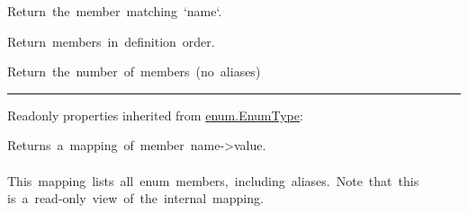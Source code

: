 \begin{longtable}[]
\begin{minipage}[t]{\linewidth}
\begin{longtable}[]
\begin{minipage}[t]{\linewidth}
\begin{description}
\tightlist
\item[\protect\hypertarget{illuminationType-__getitem__}{}{\textbf{\_\_getitem\_\_}}(name){{
from \href{enum.html\#EnumType}{enum.EnumType}}}]
{Return~the~member~matching~`name`.}
\end{description}

\begin{description}
\tightlist
\item[\protect\hypertarget{illuminationType-__iter__}{}{\textbf{\_\_iter\_\_}}(){{
from \href{enum.html\#EnumType}{enum.EnumType}}}]
{Return~members~in~definition~order.}
\end{description}

\begin{description}
\tightlist
\item[\protect\hypertarget{illuminationType-__len__}{}{\textbf{\_\_len\_\_}}(){{
from \href{enum.html\#EnumType}{enum.EnumType}}}]
{Return~the~number~of~members~(no~aliases)}
\end{description}

\begin{center}\rule{0.5\linewidth}{0.5pt}\end{center}

Readonly properties inherited from
\href{enum.html\#EnumType}{enum.EnumType}:\\

\begin{description}
\tightlist
\item[\textbf{\_\_members\_\_}]
{Returns~a~mapping~of~member~name-\textgreater value.\\
\hspace*{0.333em}\\
This~mapping~lists~all~enum~members,~including~aliases.~Note~that~this\\
is~a~read-only~view~of~the~internal~mapping.}
\end{description}\strut
\end{minipage} \\
\bottomrule
\end{longtable}


\end{minipage}
\end{longtable}

